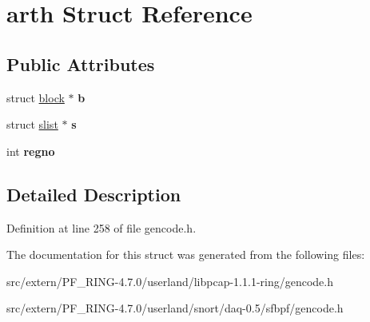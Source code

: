 \hypertarget{structarth}{
\section{arth Struct Reference}
\label{structarth}
}
\subsection*{Public Attributes}
\begin{DoxyCompactItemize}
\item 
\hypertarget{structarth_a17c55c5378df66e67f9822a634e0ffc0}{
struct \hyperlink{structblock}{block} $\ast$ {\bfseries b}}
\label{structarth_a17c55c5378df66e67f9822a634e0ffc0}

\item 
\hypertarget{structarth_a254ce748950fa6f2197f97247608bb97}{
struct \hyperlink{structslist}{slist} $\ast$ {\bfseries s}}
\label{structarth_a254ce748950fa6f2197f97247608bb97}

\item 
\hypertarget{structarth_a2a9a8612654a96ddbbbd55e98fd9837b}{
int {\bfseries regno}}
\label{structarth_a2a9a8612654a96ddbbbd55e98fd9837b}

\end{DoxyCompactItemize}


\subsection{Detailed Description}


Definition at line 258 of file gencode.h.



The documentation for this struct was generated from the following files:\begin{DoxyCompactItemize}
\item 
src/extern/PF\_\-RING-\/4.7.0/userland/libpcap-\/1.1.1-\/ring/gencode.h\item 
src/extern/PF\_\-RING-\/4.7.0/userland/snort/daq-\/0.5/sfbpf/gencode.h\end{DoxyCompactItemize}
